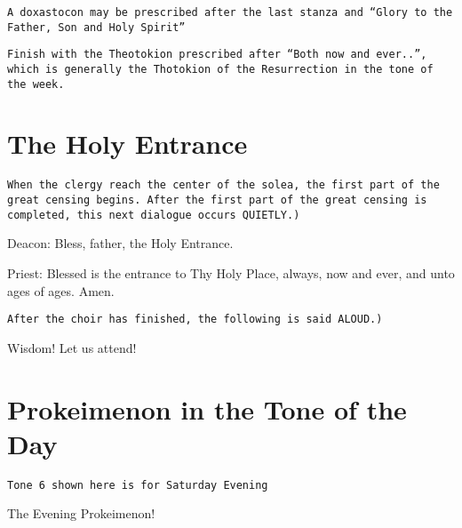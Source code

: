 \documentclass[twoside, letterpaper, 12pt]{report}
\newcommand{\instruction}[1]{%
  \texttt{\scriptsize{#1}}%
}
\newcommand{\centeredsection}[1]{%
  \section*{\centering{}#1}%
}
\begin{document}
\vbox{}
\instruction{A doxastocon may be prescribed after the last stanza and
``Glory to the Father, Son and Holy Spirit''}

\vbox{}
\instruction{Finish with the Theotokion prescribed after ``Both now and ever..'',
which is generally the Thotokion of the Resurrection in the tone of the week.
}
\cleardoublepage

\centeredsection{The Holy Entrance}

\instruction{When the clergy reach the center of the solea,
the first part of the great censing begins. After the first part of the great
censing is completed, this next dialogue occurs QUIETLY.)}

\vbox{}
{
\footnotesize
Deacon: Bless, father, the Holy Entrance.

Priest: Blessed is the entrance to Thy Holy Place, always, now and ever, and unto ages of ages. Amen.
}

\vbox{}
\instruction{After the choir has finished, the following is said ALOUD.)}

\begin{deacon}
\item Wisdom! Let us attend!
\end{deacon}


\clearpage
\centeredsection{Prokeimenon in the Tone of the Day}

\instruction{Tone 6 shown here is for Saturday Evening}

\begin{deacon}
    \item The Evening Prokeimenon!
\end{deacon}

\end{document}
